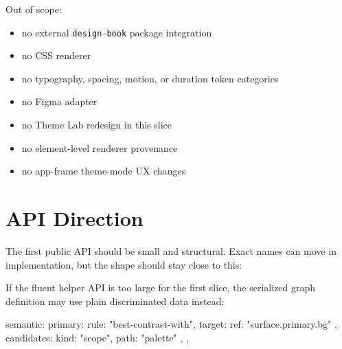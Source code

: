 Out of scope:

\begin{itemize}
\tightlist
\item
  no external \texttt{d\allowbreak{}e\allowbreak{}s\allowbreak{}i\allowbreak{}g\allowbreak{}n\allowbreak{}-\allowbreak{}b\allowbreak{}o\allowbreak{}o\allowbreak{}k} package integration
\item
  no CSS renderer
\item
  no typography, spacing, motion, or duration token categories
\item
  no Figma adapter
\item
  no Theme Lab redesign in this slice
\item
  no element-level renderer provenance
\item
  no app-frame theme-mode UX changes
\end{itemize}

\section{API Direction}\label{record-184-api-direction}

The first public API should be small and structural. Exact names can move in implementation, but the shape should stay close to this:


If the fluent helper API is too large for the first slice, the serialized graph definition may use plain discriminated data instead:

\begin{CodeBlock}
semantic: {
  primary: {
    rule: "best-contrast-with",
    target: { ref: "surface.primary.bg" },
    candidates: { kind: "scope", path: "palette" },
  },
}
\end{CodeBlock}

